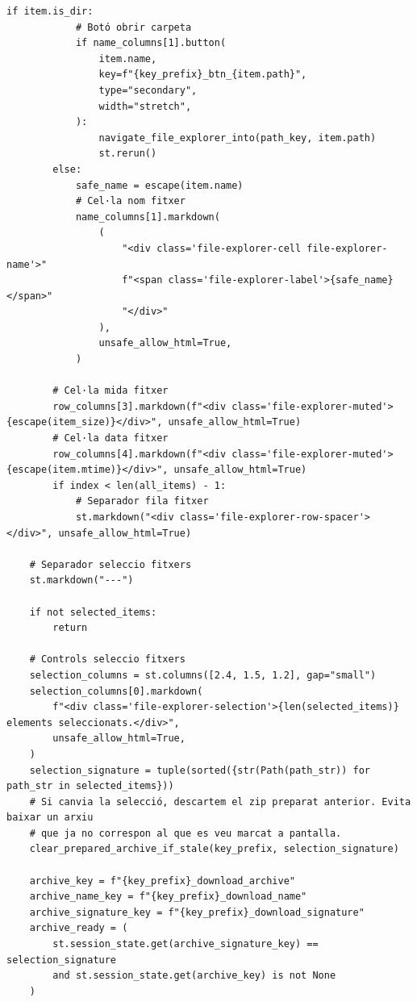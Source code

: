 \documentclass[10pt,a4paper]{article}
\begin{document}
\begin{lstlisting}[style=studioPython,caption={pages/Gestionar\_Arxius.py},label={lst:pages-gestionar-arxius-py}]
        if item.is_dir:
            # Botó obrir carpeta
            if name_columns[1].button(
                item.name,
                key=f"{key_prefix}_btn_{item.path}",
                type="secondary",
                width="stretch",
            ):
                navigate_file_explorer_into(path_key, item.path)
                st.rerun()
        else:
            safe_name = escape(item.name)
            # Cel·la nom fitxer
            name_columns[1].markdown(
                (
                    "<div class='file-explorer-cell file-explorer-name'>"
                    f"<span class='file-explorer-label'>{safe_name}</span>"
                    "</div>"
                ),
                unsafe_allow_html=True,
            )

        # Cel·la mida fitxer
        row_columns[3].markdown(f"<div class='file-explorer-muted'>{escape(item_size)}</div>", unsafe_allow_html=True)
        # Cel·la data fitxer
        row_columns[4].markdown(f"<div class='file-explorer-muted'>{escape(item.mtime)}</div>", unsafe_allow_html=True)
        if index < len(all_items) - 1:
            # Separador fila fitxer
            st.markdown("<div class='file-explorer-row-spacer'></div>", unsafe_allow_html=True)

    # Separador seleccio fitxers
    st.markdown("---")

    if not selected_items:
        return

    # Controls seleccio fitxers
    selection_columns = st.columns([2.4, 1.5, 1.2], gap="small")
    selection_columns[0].markdown(
        f"<div class='file-explorer-selection'>{len(selected_items)} elements seleccionats.</div>",
        unsafe_allow_html=True,
    )
    selection_signature = tuple(sorted({str(Path(path_str)) for path_str in selected_items}))
    # Si canvia la selecció, descartem el zip preparat anterior. Evita baixar un arxiu
    # que ja no correspon al que es veu marcat a pantalla.
    clear_prepared_archive_if_stale(key_prefix, selection_signature)

    archive_key = f"{key_prefix}_download_archive"
    archive_name_key = f"{key_prefix}_download_name"
    archive_signature_key = f"{key_prefix}_download_signature"
    archive_ready = (
        st.session_state.get(archive_signature_key) == selection_signature
        and st.session_state.get(archive_key) is not None
    )


\end{lstlisting}
\end{document}
